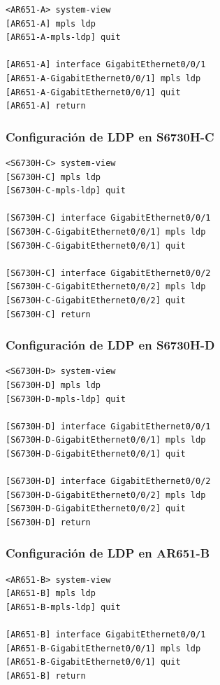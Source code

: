\begin{lstlisting}[style=terminal]
<AR651-A> system-view
[AR651-A] mpls ldp
[AR651-A-mpls-ldp] quit

[AR651-A] interface GigabitEthernet0/0/1
[AR651-A-GigabitEthernet0/0/1] mpls ldp
[AR651-A-GigabitEthernet0/0/1] quit
[AR651-A] return
\end{lstlisting}

\subsubsection{Configuración de LDP en S6730H-C}

\begin{lstlisting}[style=terminal]
<S6730H-C> system-view
[S6730H-C] mpls ldp
[S6730H-C-mpls-ldp] quit

[S6730H-C] interface GigabitEthernet0/0/1
[S6730H-C-GigabitEthernet0/0/1] mpls ldp
[S6730H-C-GigabitEthernet0/0/1] quit

[S6730H-C] interface GigabitEthernet0/0/2
[S6730H-C-GigabitEthernet0/0/2] mpls ldp
[S6730H-C-GigabitEthernet0/0/2] quit
[S6730H-C] return
\end{lstlisting}

\subsubsection{Configuración de LDP en S6730H-D}

\begin{lstlisting}[style=terminal]
<S6730H-D> system-view
[S6730H-D] mpls ldp
[S6730H-D-mpls-ldp] quit

[S6730H-D] interface GigabitEthernet0/0/1
[S6730H-D-GigabitEthernet0/0/1] mpls ldp
[S6730H-D-GigabitEthernet0/0/1] quit

[S6730H-D] interface GigabitEthernet0/0/2
[S6730H-D-GigabitEthernet0/0/2] mpls ldp
[S6730H-D-GigabitEthernet0/0/2] quit
[S6730H-D] return
\end{lstlisting}

\subsubsection{Configuración de LDP en AR651-B}

\begin{lstlisting}[style=terminal]
<AR651-B> system-view
[AR651-B] mpls ldp
[AR651-B-mpls-ldp] quit

[AR651-B] interface GigabitEthernet0/0/1
[AR651-B-GigabitEthernet0/0/1] mpls ldp
[AR651-B-GigabitEthernet0/0/1] quit
[AR651-B] return
\end{lstlisting}

